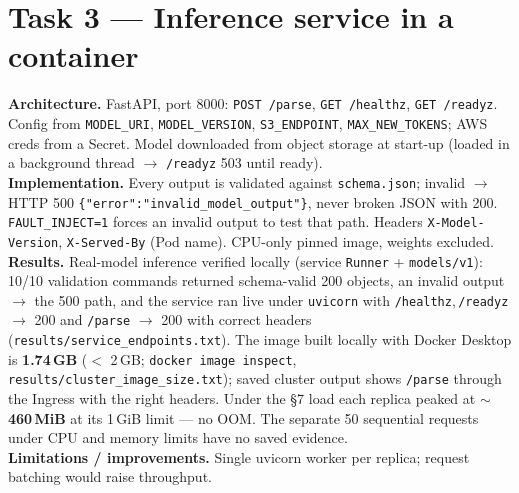 \documentclass[10pt,a4paper]{article}
\newcommand{\code}[1]{\texttt{\small #1}}
\begin{document}
\section{Task 3 --- Inference service in a container}
\textbf{Architecture.} FastAPI, port 8000: \code{POST /parse}, \code{GET /healthz}, \code{GET /readyz}.
Config from \code{MODEL\_URI}, \code{MODEL\_VERSION}, \code{S3\_ENDPOINT}, \code{MAX\_NEW\_TOKENS}; AWS creds
from a Secret. Model downloaded from object storage at start-up (loaded in a background thread
$\rightarrow$ \code{/readyz} 503 until ready).\\
\textbf{Implementation.} Every output is validated against \code{schema.json}; invalid $\rightarrow$ HTTP 500
\code{\{"error":"invalid\_model\_output"\}}, never broken JSON with 200. \code{FAULT\_INJECT=1} forces an
invalid output to test that path. Headers \code{X-Model-Version}, \code{X-Served-By} (Pod name). CPU-only
pinned image, weights excluded.\\
\textbf{Results.} Real-model inference verified locally (service \code{Runner} + \code{models/v1}): 10/10
validation commands returned schema-valid 200 objects, an invalid output $\rightarrow$ the 500 path, and the
service ran live under \code{uvicorn} with \code{/healthz},\,\code{/readyz} $\rightarrow$ 200 and
\code{/parse} $\rightarrow$ 200 with correct headers (\code{results/service\_endpoints.txt}). The image
built locally with Docker Desktop is \textbf{1.74\,GB} ($<$ 2\,GB; \code{docker image inspect},
\code{results/cluster\_image\_size.txt}); saved cluster output shows \code{/parse} through the Ingress with the right
headers. Under the \S7 load each replica peaked at $\sim$\textbf{460\,MiB} at its 1\,GiB limit --- no OOM.
The separate 50 sequential requests under CPU and memory limits have no saved evidence.\\
\textbf{Limitations / improvements.} Single uvicorn worker per replica; request batching would raise
throughput.
\end{document}

